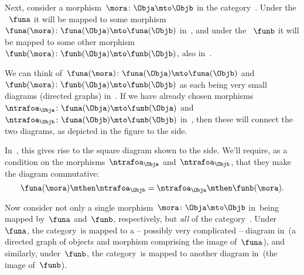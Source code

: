 \begin{marginfigure}
    \hfill
\end{marginfigure}

Next, consider a morphism~$\mora \colon \Obja \mto \Objb$ in the category~\CatC.
Under the ~$\funa$ it will be mapped to some morphism~$\funa(\mora)\colon \funa(\Obja) \mto \funa(\Objb)$ in~\CatD, and under the ~$\funb$ it will be mapped to some other morphism~$\funb(\mora)\colon \funb(\Obja) \mto \funb(\Objb)$, also in~\CatD.

\begin{marginfigure}
    \hfill
\end{marginfigure}

We can think of~$\funa(\mora)\colon \funa(\Obja) \mto \funa(\Objb)$ and~$\funb(\mora)\colon \funb(\Obja) \mto \funb(\Objb)$ as each being very small diagrams (directed graphs) in~\CatD.
If we have already chosen morphisms~$\ntrafoa_\Obja\colon \funa(\Obja) \mto \funb(\Obja)$ and~$\ntrafoa_\Objb\colon \funa(\Objb) \mto \funb(\Objb)$ in~\CatD, then these will connect the two diagrams, as depicted in the figure to the side.

%
\begin{marginfigure}
    \hfill
    \caption{}
    \label{fig:naturality-square}
\end{marginfigure}

In~\CatD, this gives rise to the square diagram shown to the side.
We'll require, as a condition on the morphisms~$\ntrafoa_\Obja$ and~$\ntrafoa_\Objb$, that they make the diagram commutative:
\begin{equation}
    \funa(\mora) \mthen \ntrafoa_\Objb = \ntrafoa_\Obja \mthen \funb(\mora).
\end{equation}

Now consider not only a single morphism~$\mora \colon \Obja \mto \Objb$ in~\CatC being mapped by~$\funa$ and~$\funb$, respectively, but \emph{all} of the category~\CatC.
Under~$\funa$, the category~\CatC is mapped to a -- possibly very complicated -- diagram in~\CatD (a directed graph of objects and morphism comprising the image of~$\funa$), and similarly, under~$\funb$, the category~\CatC is mapped to another diagram in~\CatD (the image of~$\funb$).

